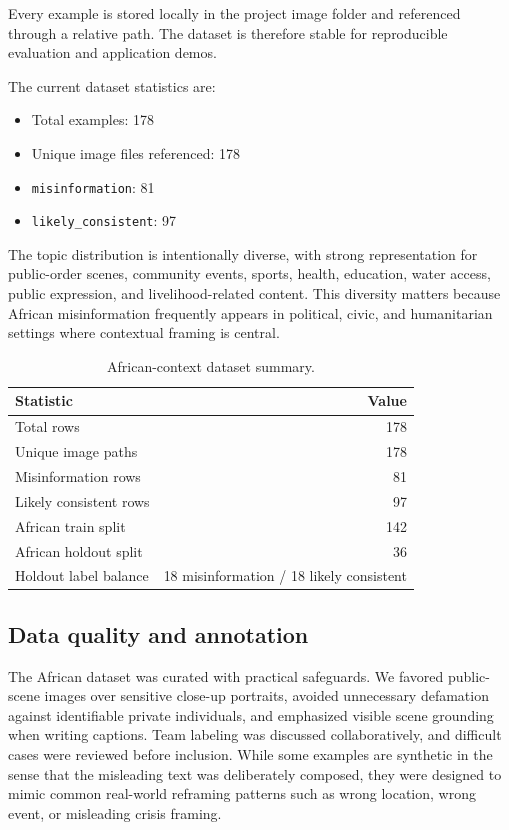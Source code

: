 \documentclass[a4paper,10.5pt,twoside]{article}
\begin{document}
Every example is stored locally in the project image folder and referenced through a relative path. The dataset is therefore stable for reproducible evaluation and application demos.

The current dataset statistics are:
\begin{itemize}[leftmargin=1.5em]
    \item Total examples: 178
    \item Unique image files referenced: 178
    \item \texttt{misinformation}: 81
    \item \texttt{likely\_consistent}: 97
\end{itemize}

The topic distribution is intentionally diverse, with strong representation for public-order scenes, community events, sports, health, education, water access, public expression, and livelihood-related content. This diversity matters because African misinformation frequently appears in political, civic, and humanitarian settings where contextual framing is central.

\begin{table}[H]
\centering
\caption{African-context dataset summary.}
\label{tab:african_summary}
\begin{tabular}{lr}
\toprule
Statistic & Value \\
\midrule
Total rows & 178 \\
Unique image paths & 178 \\
Misinformation rows & 81 \\
Likely consistent rows & 97 \\
African train split & 142 \\
African holdout split & 36 \\
Holdout label balance & 18 misinformation / 18 likely consistent \\
\bottomrule
\end{tabular}
\end{table}

\subsection{Data quality and annotation}
The African dataset was curated with practical safeguards. We favored public-scene images over sensitive close-up portraits, avoided unnecessary defamation against identifiable private individuals, and emphasized visible scene grounding when writing captions. Team labeling was discussed collaboratively, and difficult cases were reviewed before inclusion. While some examples are synthetic in the sense that the misleading text was deliberately composed, they were designed to mimic common real-world reframing patterns such as wrong location, wrong event, or misleading crisis framing.
\end{document}
